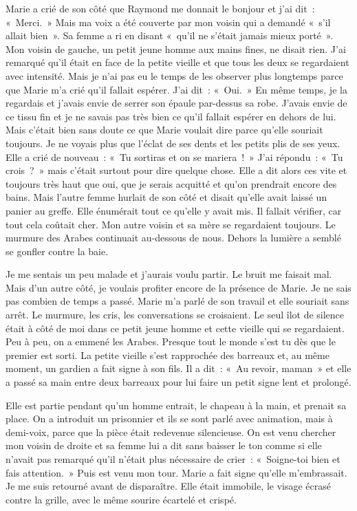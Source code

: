 \documentclass[french,twoside]{book} %
\begin{document}
Marie a crié de son côté que Raymond me donnait le bonjour et j’ai dit : « Merci. » Mais ma voix a été couverte par mon voisin qui a demandé « s’il allait bien ». Sa femme a ri en disant « qu’il ne s’était jamais mieux porté ». Mon voisin de gauche, un petit jeune homme aux mains fines, ne disait rien. J'ai remarqué qu’il était en face de la petite vieille et que tous les deux se regardaient avec intensité. Mais je n’ai pas eu le temps de les observer plus longtemps parce que Marie m’a crié qu’il fallait espérer. J'ai dit : « Oui. » En même temps, je la regardais et j’avais envie de serrer son épaule par-dessus sa robe. J'avais envie de ce tissu fin et je ne savais pas très bien ce qu’il fallait espérer en dehors de lui. Mais c’était bien sans doute ce que Marie voulait dire parce qu’elle souriait toujours. Je ne voyais plus que l’éclat de ses dents et les petits plis de ses yeux. Elle a crié de nouveau : « Tu sortiras et on se mariera ! » J'ai répondu : « Tu crois ? » mais c’était surtout pour dire quelque chose. Elle a dit alors ces vite et toujours très haut que oui, que je serais acquitté et qu’on prendrait encore des bains. Mais l’autre femme hurlait de son côté et disait qu’elle avait laissé un panier au greffe. Elle énumérait tout ce qu’elle y avait mis. Il fallait vérifier, car tout cela coûtait cher. Mon autre voisin et sa mère se regardaient toujours. Le murmure des Arabes continuait au-dessous de nous. Dehors la lumière a semblé se gonfler contre la baie.\par
Je me sentais un peu malade et j’aurais voulu partir. Le bruit me faisait mal. Mais d’un autre côté, je voulais profiter encore de la présence de Marie. Je ne sais pas combien de temps a passé. Marie m’a parlé de son travail et elle souriait sans arrêt. Le murmure, les cris, les conversations se croisaient. Le seul îlot de silence était à côté de moi dans ce petit jeune homme et cette vieille qui se regardaient. Peu à peu, on a emmené les Arabes. Presque tout le monde s’est tu dès que le premier est sorti. La petite vieille s’est rapprochée des barreaux et, au même moment, un gardien a fait signe à son fils. Il a dit : « Au revoir, maman » et elle a passé sa main entre deux barreaux pour lui faire un petit signe lent et prolongé.\par
Elle est partie pendant qu’un homme entrait, le chapeau à la main, et prenait sa place. On a introduit un prisonnier et ils se sont parlé avec animation, mais à demi-voix, parce que la pièce était redevenue silencieuse. On est venu chercher mon voisin de droite et sa femme lui a dit sans baisser le ton comme si elle n’avait pas remarqué qu’il n’était plus nécessaire de crier : « Soigne-toi bien et fais attention. » Puis est venu mon tour. Marie a fait signe qu’elle m’embrassait. Je me suis retourné avant de disparaître. Elle était immobile, le visage écrasé contre la grille, avec le même sourire écartelé et crispé.\par
\end{document}
